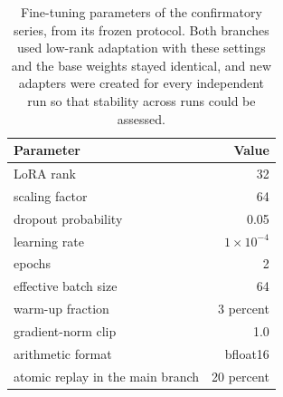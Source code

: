\begin{table}[!tbh]
\centering\footnotesize\setlength{\tabcolsep}{6pt}
\begin{tabular}{|l|r|}
\hline
\textbf{Parameter} & \textbf{Value} \\
\hline
LoRA rank & 32 \\ \hline
scaling factor & 64 \\ \hline
dropout probability & 0.05 \\ \hline
learning rate & $1 \times 10^{-4}$ \\ \hline
epochs & 2 \\ \hline
effective batch size & 64 \\ \hline
warm-up fraction & 3 percent \\ \hline
gradient-norm clip & 1.0 \\ \hline
arithmetic format & bfloat16 \\ \hline
atomic replay in the main branch & 20 percent \\ \hline
\end{tabular}
\caption{Fine-tuning parameters of the confirmatory series, from its frozen protocol.
Both branches used low-rank adaptation with these settings and the base weights
stayed identical, and new adapters were created for every independent run so that
stability across runs could be assessed.}
\label{tab:hyper}
\end{table}
